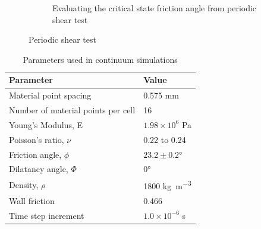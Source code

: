 \begin{figure}
\begin{subfigure}[b]{0.575\textwidth}
\caption{Evaluating the critical state friction angle from periodic shear 
test}
\label{fig:Sxy_vs_Syy}
\end{subfigure} 
\caption{Periodic shear test}
\label{fig:shear_test}
\end{figure}


\begin{table}
\caption{Parameters used in continuum simulations}
\label{table:MPMData}
\centering
\begin{tabular}{ll}
\toprule
\textbf{Parameter} & \textbf{Value} \\ \midrule
Material point spacing & 0.575 \si{\mm} \\
Number of material points per cell & 16 \\
Young's Modulus, E & $1.98 \times 10 ^{6}$ \si{\Pa} \\
Poisson's ratio, $\nu$ & 0.22 to 0.24 \\ 
Friction angle, $\phi$ & $23.2 \pm 0.2\si{\degree}$ \\
Dilatancy angle, $\varPhi$ & $0$\si{\degree} \\
Density, $\rho$ & 1800 \si{\kg\per\m\cubed}\\
Wall friction & 0.466 \\
Time step increment & $1.0 \times 10^{-6}$ \si{\second}\\ \bottomrule
\end{tabular}
\end{table}

